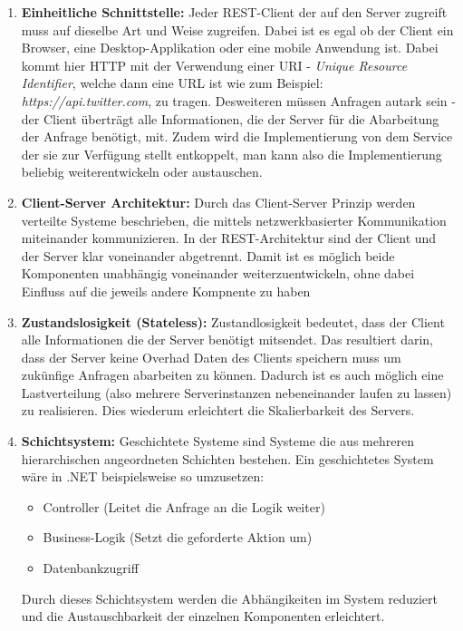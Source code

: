 \documentclass[bachelor, german ]{hgbthesis}
\begin{document}
\begin{enumerate}
    \item \textbf{Einheitliche Schnittstelle: }
    Jeder REST-Client der auf den Server zugreift muss auf dieselbe Art und Weise zugreifen.
    Dabei ist es egal ob der Client ein Browser, eine Desktop-Applikation oder eine mobile Anwendung ist.
    Dabei kommt hier HTTP mit der Verwendung einer URI - \textit{Unique Resource Identifier}, welche dann eine URL ist wie zum Beispiel: \textit{https://api.twitter.com}, zu tragen.
    Desweiteren müssen Anfragen autark sein - der Client überträgt alle Informationen, die der Server für die Abarbeitung der Anfrage benötigt, mit.
    Zudem wird die Implementierung von dem Service der sie zur Verfügung stellt entkoppelt, man kann also die Implementierung beliebig weiterentwickeln oder austauschen.
    \item \textbf{Client-Server Architektur: }
    Durch das Client-Server Prinzip werden verteilte Systeme beschrieben, die mittels netzwerkbasierter Kommunikation miteinander kommunizieren.
    In der REST-Architektur sind der Client und der Server klar voneinander abgetrennt.
    Damit ist es möglich beide Komponenten unabhängig voneinander weiterzuentwickeln, ohne dabei Einfluss auf die jeweils andere Kompnente zu haben
    \item \textbf{Zustandslosigkeit (Stateless): }
    Zustandlosigkeit bedeutet, dass der Client alle Informationen die der Server benötigt mitsendet.
    Das resultiert darin, dass der Server keine Overhad Daten des Clients speichern muss um zukünfige Anfragen abarbeiten zu können.
    Dadurch ist es auch möglich eine Lastverteilung (also mehrere Serverinstanzen nebeneinander laufen zu lassen) zu realisieren. Dies wiederum erleichtert die Skalierbarkeit des Servers.
    \item \textbf{Schichtsystem: }
    Geschichtete Systeme sind Systeme die aus mehreren hierarchischen angeordneten Schichten bestehen. Ein geschichtetes System wäre in .NET beispielsweise so umzusetzen:
    \begin{itemize}
        \item Controller (Leitet die Anfrage an die Logik weiter)
        \item Business-Logik (Setzt die geforderte Aktion um)
        \item Datenbankzugriff
    \end{itemize}
    Durch dieses Schichtsystem werden die Abhängikeiten im System reduziert und die Austauschbarkeit der einzelnen Komponenten erleichtert.

\end{enumerate}
\end{document}

